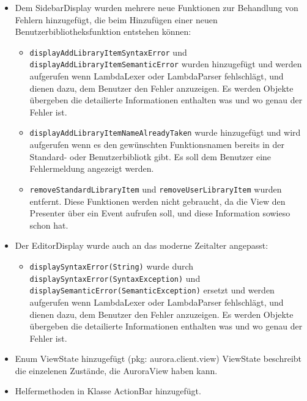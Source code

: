 \documentclass[parskip=full,11pt,twoside]{scrartcl}
\begin{document}
\begin{itemize}
    \item Dem SidebarDisplay wurden mehrere neue Funktionen zur Behandlung von Fehlern hinzugefügt, die beim Hinzufügen einer neuen Benutzerbibliotheksfunktion entstehen können:
    	\begin{itemize}
        	\item \texttt{displayAddLibraryItemSyntaxError} und \newline
        	\texttt{displayAddLibraryItemSemanticError} wurden hinzugefügt und werden aufgerufen wenn LambdaLexer oder LambdaParser fehlschlägt, und dienen dazu, dem Benutzer den Fehler anzuzeigen. Es werden Objekte übergeben die detailierte Informationen enthalten was und wo genau der Fehler ist.
        	\item \texttt{displayAddLibraryItemNameAlreadyTaken} wurde hinzugefügt und wird aufgerufen wenn es den gewünschten Funktionsnamen bereits in der Standard- oder Benutzerbibliotk gibt. Es soll dem Benutzer eine Fehlermeldung angezeigt werden.
            \item \texttt{removeStandardLibraryItem} und \newline
            	\texttt{removeUserLibraryItem} wurden entfernt. Diese Funktionen werden nicht gebraucht, da die View den Presenter über ein Event aufrufen soll, und diese Information sowieso schon hat.
        \end{itemize}
    \item Der EditorDisplay wurde auch an das moderne Zeitalter angepasst:
    	\begin{itemize}
    		\item \texttt{displaySyntaxError(String)} wurde
            durch \newline \texttt{displaySyntaxError(SyntaxException)} und \newline
        	\texttt{displaySemanticError(SemanticException)} ersetzt und werden aufgerufen wenn LambdaLexer oder LambdaParser fehlschlägt, und dienen dazu, dem Benutzer den Fehler anzuzeigen. Es werden Objekte übergeben die detailierte Informationen enthalten was und wo genau der Fehler ist.
    	\end{itemize}

    \item Enum ViewState hinzugefügt (pkg: aurora.client.view)
    \newline
    ViewState beschreibt die einzelenen Zustände, die AuroraView haben kann.

    \item Helfermethoden in Klasse ActionBar hinzugefügt.


\end{itemize}
\end{document}
